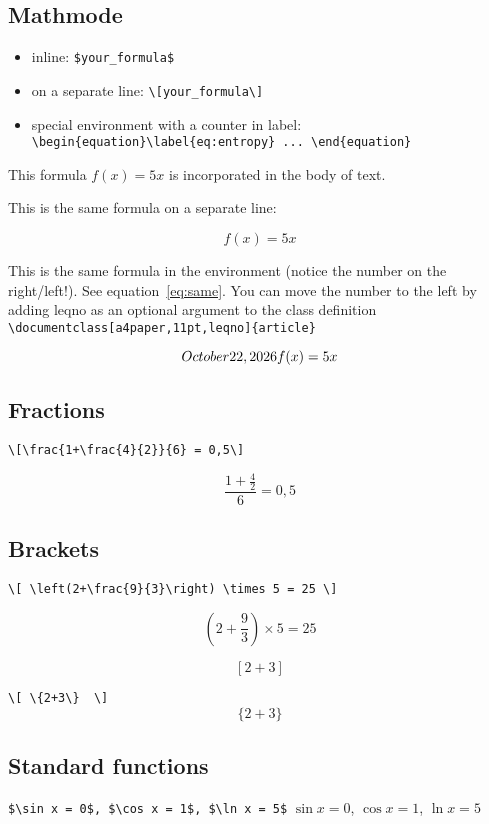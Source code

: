 \documentclass[a4paper,11pt,leqno]{article}
\begin{document}
\subsection{Mathmode}

\begin{itemize}
	\item inline: \verb|$your_formula$|
	\item on a separate line: \verb|\[your_formula\]|
	\item special environment with a counter in label: \verb|\begin{equation}\label{eq:entropy} ... \end{equation}|
\end{itemize}

This formula $f(x)=5x$ is incorporated in the body of text. 

This is the same formula on a separate line:

\[ f(x)=5x \]

This is the same formula in the environment (notice the number on the right/left!). See equation~\ref{eq:same}. You can move the number to the left by adding leqno as an optional argument to the class definition \verb|\documentclass[a4paper,11pt,leqno]{article}| 

\begin{equation}\label{eq:same}\today
f(x)=5x
\end{equation}

\subsection{Fractions}
\verb|\[\frac{1+\frac{4}{2}}{6} = 0,5\]|

\[\frac{1+\frac{4}{2}}{6} = 0,5\]

\subsection{Brackets}
\verb|\[ \left(2+\frac{9}{3}\right) \times 5 = 25 \]|

\[ \left(2+\frac{9}{3}\right) \times 5 = 25 \]

\[  [2+3]  \]

\verb|\[ \{2+3\}  \]|
\[ \{2+3\}  \]

\subsection{Standard functions}
\verb|$\sin x = 0$, $\cos x = 1$, $\ln x = 5$|
$\sin x = 0$, $\cos x = 1$, $\ln x = 5$
\end{document}
